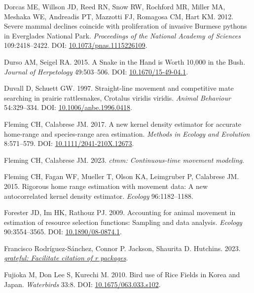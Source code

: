 \documentclass[10pt,a4paper]{article}
\newlength{\cslhangindent}
\newenvironment{CSLReferences}[2] %
 {\begin{list}{}{%
  \setlength{\itemindent}{0pt}
  \setlength{\leftmargin}{0pt}
  \setlength{\parsep}{0pt}
  \ifodd #1
   \setlength{\leftmargin}{\cslhangindent}
   \setlength{\itemindent}{-1\cslhangindent}
  \fi
  \setlength{\itemsep}{#2\baselineskip}}}
 {\end{list}}
\begin{document}
\begin{CSLReferences}{1}{0}
Dorcas ME, Willson JD, Reed RN, Snow RW, Rochford MR, Miller MA, Meshaka WE, Andreadis PT, Mazzotti FJ, Romagosa CM, Hart KM. 2012. Severe mammal declines coincide with proliferation of invasive {Burmese} pythons in {Everglades} {National} {Park}. \emph{Proceedings of the National Academy of Sciences} 109:2418--2422. DOI: \href{https://doi.org/10.1073/pnas.1115226109}{10.1073/pnas.1115226109}.

Durso AM, Seigel RA. 2015. A {Snake} in the {Hand} is {Worth} 10,000 in the {Bush}. \emph{Journal of Herpetology} 49:503--506. DOI: \href{https://doi.org/10.1670/15-49-04.1}{10.1670/15-49-04.1}.

Duvall D, Schuett GW. 1997. Straight-line movement and competitive mate searching in prairie rattlesnakes, {Crotalus} viridis viridis. \emph{Animal Behaviour} 54:329--334. DOI: \href{https://doi.org/10.1006/anbe.1996.0418}{10.1006/anbe.1996.0418}.

Fleming CH, Calabrese JM. 2017. A new kernel density estimator for accurate home-range and species-range area estimation. \emph{Methods in Ecology and Evolution} 8:571--579. DOI: \href{https://doi.org/10.1111/2041-210X.12673}{10.1111/2041-210X.12673}.

Fleming CH, Calabrese JM. 2023. \emph{{ctmm}: Continuous-time movement modeling}.

Fleming CH, Fagan WF, Mueller T, Olson KA, Leimgruber P, Calabrese JM. 2015. Rigorous home range estimation with movement data: {A} new autocorrelated kernel density estimator. \emph{Ecology} 96:1182--1188.

Forester JD, Im HK, Rathouz PJ. 2009. Accounting for animal movement in estimation of resource selection functions: Sampling and data analysis. \emph{Ecology} 90:3554--3565. DOI: \href{https://doi.org/10.1890/08-0874.1}{10.1890/08-0874.1}.

Francisco Rodríguez-Sánchez, Connor P. Jackson, Shaurita D. Hutchins. 2023. \emph{\href{https://github.com/Pakillo/grateful}{{grateful}: Facilitate citation of r packages}}.

Fujioka M, Don Lee S, Kurechi M. 2010. Bird use of {Rice} {Fields} in {Korea} and {Japan}. \emph{Waterbirds} 33:8. DOI: \href{https://doi.org/10.1675/063.033.s102}{10.1675/063.033.s102}.


\end{CSLReferences}
\end{document}
